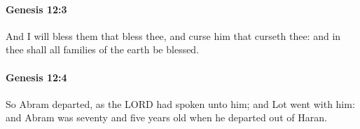 		\paragraph{Genesis 12:3} %
			\label{GENESIS-12-3}

			And I will bless them that bless thee, and curse him that curseth thee: and in thee shall all families of the earth be blessed.


		\paragraph{Genesis 12:4} %
			\label{GENESIS-12-4}

			So Abram departed, as the LORD had spoken unto him; and Lot went with him: and Abram was seventy and five years old when he departed out of Haran.


